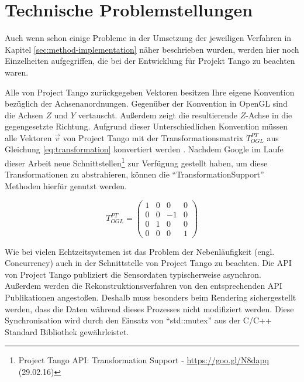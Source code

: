 \section{Technische Problemstellungen}

Auch wenn schon einige Probleme in der Umsetzung der jeweiligen Verfahren in Kapitel \ref{sec:method-implementation} näher beschrieben wurden, werden hier noch Einzelheiten aufgegriffen, die bei der Entwicklung für Projekt Tango zu beachten waren. 

Alle von Project Tango zurückgegeben Vektoren besitzen Ihre eigene Konvention bezüglich der Achsenanordnungen. Gegenüber der Konvention in OpenGL sind die Achsen \(Z\) und \(Y\) vertauscht. Außerdem zeigt die resultierende \(Z\)-Achse in die gegengesetzte Richtung. Aufgrund dieser Unterschiedlichen Konvention müssen alle Vektoren \(\vec{v}\) von Project Tango mit der Transformationsmatrix \(T_{OGL}^{PT}\) aus Gleichung \ref{eq:transformation} konvertiert werden \citep{Proje15:online}. Nachdem Google im Laufe dieser Arbeit neue Schnittstellen\footnote{Project Tango API: Transformation Support - \url{https://goo.gl/N8dapq} (29.02.16)} zur Verfügung gestellt haben, um diese Transformationen zu abstrahieren, können die \enquote{TransformationSupport} Methoden hierfür genutzt werden.

\begin{equation} \label{eq:transformation}
T_{OGL}^{PT} =\left( \begin{matrix} 1&0&0&0\\0&0&-1&0\\0&1&0&0\\0&0&0&1 \end{matrix} \right)
\end{equation}

Wie bei vielen Echtzeitsystemen ist das Problem der Nebenläufigkeit (engl. Concurrency) auch in der Schnittstelle von Project Tango zu beachten. Die API von Project Tango publiziert die Sensordaten typischerweise asynchron. Außerdem werden die Rekonstruktionsverfahren von den entsprechenden API Publikationen angestoßen. Deshalb muss besonders beim Rendering sichergestellt werden, dass die Daten während dieses Prozesses nicht modifiziert werden. Diese Synchronisation wird durch den Einsatz von \enquote{std::mutex} aus der C/C++ Standard Bibliothek gewährleistet. 


